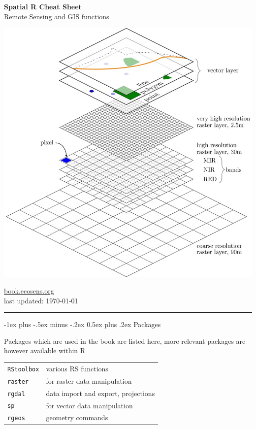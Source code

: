 \documentclass[10pt,landscape]{article}
\makeatletter
\renewcommand{\section}{\@startsection{section}{1}{0mm}%
                                {-1ex plus -.5ex minus -.2ex}%
                                {0.5ex plus .2ex}%
                                {\normalfont\large\bfseries}}
\makeatother
\begin{document}
\newlength{\MyLen}


\raggedright
\footnotesize
\begin{multicols}{3}


\setlength{\premulticols}{1pt}
\setlength{\postmulticols}{1pt}
\setlength{\multicolsep}{1pt}
\setlength{\columnsep}{2pt}

\begin{center}
     \Large{\textbf{Spatial R Cheat Sheet}} \\
     Remote Sensing and GIS functions
\end{center}

\begin{center}
 \includegraphics[width=.25\textwidth]{pics/RS_GIS_Ecology_book_wegmann_leutner_dech_book_ecosens_org_Spatial_Layer_Model.jpg}
\end{center}


\url{book.ecosens.org}\\
last updated: \today

\rule{0.32\textwidth}{0.4pt}


\section{Packages}

Packages which are used in the book are listed here, more relevant packages are however available within R

 \bigskip
 
\begin{tabular}{@{}ll@{}}
\verb!RStoolbox!    & various RS functions  \\
\verb!raster!    & for raster data manipulation \\
\verb!rgdal!  & data import and export, projections \\

\verb!sp!     & for vector data manipulation \\
\verb!rgeos!  & geometry commands \\


\end{tabular}
\end{multicols}
\end{document}
